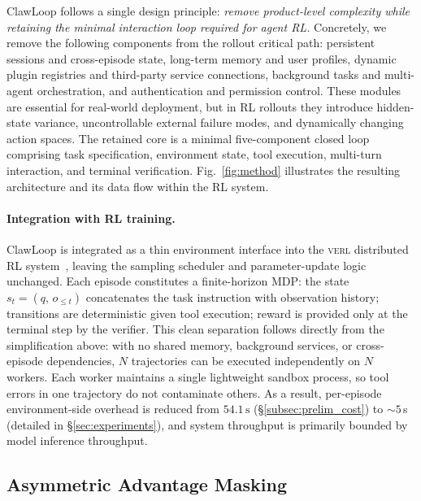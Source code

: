 \documentclass[letterpaper]{article} %
\begin{document}
ClawLoop follows a single design principle: \emph{remove product-level complexity while retaining the minimal interaction loop required for agent RL.}
Concretely, we remove the following components from the rollout critical path: persistent sessions and cross-episode state, long-term memory and user profiles, dynamic plugin registries and third-party service connections, background tasks and multi-agent orchestration, and authentication and permission control.
These modules are essential for real-world deployment, but in RL rollouts they introduce hidden-state variance, uncontrollable external failure modes, and dynamically changing action spaces.
The retained core is a minimal five-component closed loop comprising task specification, environment state, tool execution, multi-turn interaction, and terminal verification.
Fig.~\ref{fig:method} illustrates the resulting architecture and its data flow within the RL system.

\paragraph{Integration with RL training.}
ClawLoop is integrated as a thin environment interface into the \textsc{verl} distributed RL system~\citep{sheng2024verl}, leaving the sampling scheduler and parameter-update logic unchanged.
Each episode constitutes a finite-horizon MDP: the state $s_t=(q,\,o_{\leq t})$ concatenates the task instruction with observation history; transitions are deterministic given tool execution; reward is provided only at the terminal step by the verifier.
This clean separation follows directly from the simplification above: with no shared memory, background services, or cross-episode dependencies, $N$ trajectories can be executed independently on $N$ workers. 
Each worker maintains a single lightweight sandbox process, so tool errors in one trajectory do not contaminate others.
As a result, per-episode environment-side overhead is reduced from $54.1\,\mathrm{s}$ (\S\ref{subsec:prelim_cost}) to ${\sim}5$\,s (detailed in \S\ref{sec:experiments}), and system throughput is primarily bounded by model inference throughput.


\subsection{Asymmetric Advantage Masking}
\end{document}
